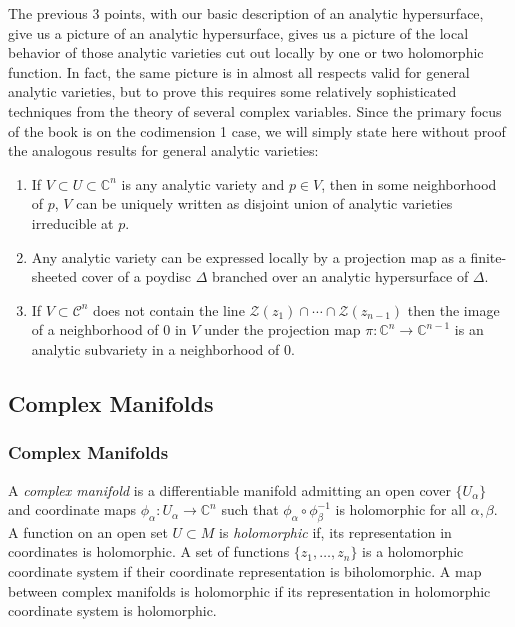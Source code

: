 The previous 3 points, with our basic description of an analytic hypersurface, give us a picture of an analytic hypersurface, gives us a picture of the local behavior of those analytic varieties cut out locally by one or two holomorphic function. In fact, the same picture is in almost all respects valid for general analytic varieties, but to prove this requires some relatively sophisticated techniques from the theory of several complex variables. Since the primary focus of the book is on the codimension 1 case, we will simply state here without proof the analogous results for general analytic varieties:

\begin{enumerate}
\item If $V \subset U \subset \mathbb{C}^n$ is any analytic variety and $p \in V$, then in some neighborhood of $p$, $V$ can be uniquely written as disjoint union of analytic varieties irreducible at $p$.
\item Any analytic variety can be expressed locally by a projection map as a finite-sheeted cover of a poydisc $\Delta$ branched over an analytic hypersurface of $\Delta$.
\item If $V \subset \mathcal{C}^n$ does not contain the line $ \mathcal{Z}(z_1) \cap \cdots \cap \mathcal{Z}(z_{n-1})$ then the image of a neighborhood of 0 in $V$ under the projection map $\pi: \mathbb{C}^n \to \mathbb{C}^{n-1}$ is an analytic subvariety in a neighborhood of 0.

\end{enumerate}

\subsection{Complex Manifolds}
\subsubsection{Complex Manifolds}


\begin{defn}

	A \textit{complex manifold} is a differentiable manifold admitting an open cover $ \{ U_{\alpha} \} $ and coordinate maps $ \phi_{\alpha}: U_{\alpha} \to \mathbb{C}^n$ such that $\phi_{\alpha} \circ \phi_{\beta}^{-1}$ is holomorphic for all $\alpha, \beta$.\\
\indent A function on an open set $U \subset M$ is \textit{holomorphic} if, its representation in coordinates is holomorphic. A set of functions $ \{ z_1, \ldots, z_n \} $ is a holomorphic coordinate system if their coordinate representation is biholomorphic. A map between complex manifolds is holomorphic if its representation in holomorphic coordinate system is holomorphic.

\end{defn}

